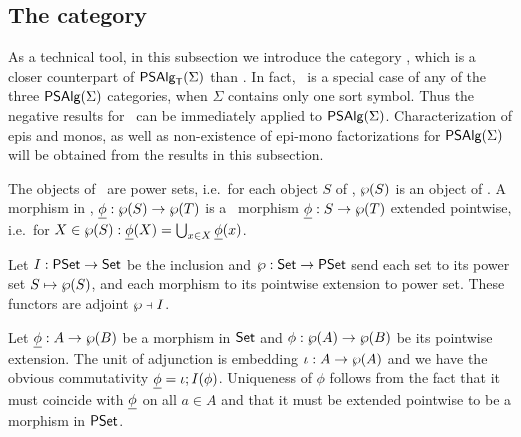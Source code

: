 \documentclass[10pt]{article}
\begin{document}

\subsection{The category \PSt }

As a technical tool, in this subsection we introduce the category
\PSt, which is a closer counterpart of $\mbox{\sf PSAlg}_{\sf T}(\Sigma)$ than \Set. In fact,
\PSt\ is a special case of any of the three $\mbox{\sf PSAlg}(\Sigma)$ categories, when
$\Sigma$ contains only one sort symbol. Thus the negative results for
\PSt\ can be immediately applied to $\mbox{\sf PSAlg}(\Sigma)$.  Characterization of epis
and monos, as well as non-existence of epi-mono factorizations for
$\mbox{\sf PSAlg}(\Sigma)$ will be obtained from the results in this subsection.

\begin{Definition}
The objects of \PSt\ are power sets, i.e.\ for each object $S$ of
\Set, $\wp(S)$ is an object of \PSt.  A morphism in \PSt,
$\underline {\phi}:\wp(S)\rightarrow \wp(T)$ is a \Set\ morphism
$\underline {\phi}:S\rightarrow\wp(T)$ extended pointwise, i.e.\ for
$X\in\wp(S) : \underline {\phi}(X) = \bigcup_{x\in X}\underline {\phi}(x)$.
\end{Definition}

\begin{Prop}
\label{le:adjSPS}
Let $I:\mbox{\rm\sf PSet}\rightarrow\mbox{\rm\sf Set}$ be the inclusion and $\wp:\mbox{\rm\sf Set}\rightarrow\mbox{\rm\sf PSet}$ send
each set to its power set $S\mapsto\wp(S)$, and each morphism to its
pointwise extension to power set. These functors are adjoint
$\wp\mathrel{\scriptstyle\dashv} I$.
\end{Prop}

\begin{Proof}
Let $\underline {\phi}:A\rightarrow\wp(B)$ be a morphism in $\mbox{\rm\sf Set}$ and
$\phi:\wp(A)\rightarrow\wp(B)$ be its pointwise extension. The unit of
adjunction is embedding $\iota:A\rightarrow\wp(A)$ and we have the obvious
commutativity $\underline {\phi} = \iota;I(\phi)$. Uniqueness of $\phi$
follows from the fact that it must coincide with $\underline {\phi}$ on all
$a\in A$ and that it must be extended pointwise to be a morphism in
$\mbox{\rm\sf PSet}$.
\end{Proof}

%
\end{document}
